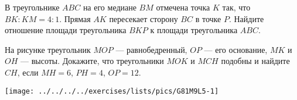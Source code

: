 \begin{class}[number=5]
\begin{listofex}
\begin{minipage}[t]{\picwidth}
		\end{minipage}
		\item В треугольнике \( ABC \) на его медиане \( BM \) отмечена точка \( K \) так, что \( BK:KM=4:1 \). Прямая \( AK \) пересекает сторону \( BC \) в точке \( P \). Найдите отношение площади треугольника \( BKP \) к площади треугольника \( ABC \).
		\item 
		\begin{minipage}[t]{\bodywidth}
			На рисунке треугольник \( MOP \) --- равнобедренный, \( OP \) --- его основание, \( MK \) и \( OH \) --- высоты. Докажите, что треугольники \( MOK \) и \( MCH \) подобны и найдите \( CH \), если \( MH=6 \), \( PH=4 \), \( OP=12 \).
		\end{minipage}
		\hspace{0.02\linewidth}
		\begin{minipage}[t]{\picwidth}
			\texttt{[image: ../../../../exercises/lists/pics/G81M9L5-1]}
		\end{minipage}
		
	\end{listofex}
\end{class}

